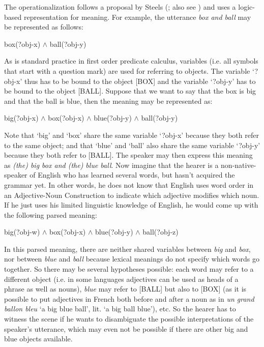 The operationalization follows a proposal by Steels (\citeyear{steels05what}; also see \cite{debeule07compositionality, steels05linking, steels06how-grammar}) and uses a logic-based representation for meaning. For example, the utterance {\em box and ball} may be represented as follows:

\ea
box(?obj-x) $\wedge$ ball(?obj-y)
\z

As is standard practice in first order predicate calculus, variables (i.e. all symbols that start with a question mark) are used for referring to objects. The variable `?obj-x' thus has to be bound to the object [BOX] and the variable `?obj-y' has to be bound to the object [BALL]. Suppose that we want to say that the box is big and that the ball is blue, then the meaning may be represented as:

\ea
\label{m:expressed}
big(?obj-x) $\wedge$ box(?obj-x) $\wedge$ blue(?obj-y) $\wedge$ ball(?obj-y)
\z

Note that `big' and `box' share the same variable `?obj-x' because they both refer to the same object; and that `blue' and `ball' also share the same variable `?obj-y' because they both refer to [BALL]. The speaker may then express this meaning as {\em (the) big box and (the) blue ball}. Now imagine that the hearer is a non-native-speaker of English who has learned several words, but hasn't acquired the grammar yet. In other words, he does not know that English uses word order in an Adjective-Noun Construction to indicate which adjective modifies which noun. If he just uses his limited linguistic knowledge of English, he would come up with the following parsed meaning:

\ea
\label{m:unexpressed}
big(?obj-w) $\wedge$ box(?obj-x) $\wedge$ blue(?obj-y) $\wedge$ ball(?obj-z)
\z

In this parsed meaning, there are neither shared variables between {\em big} and {\em box}, nor between {\em blue} and {\em ball} because lexical meanings do not specify which words go together. So there may be several hypotheses possible: each word may refer to a different object (i.e. in some languages adjectives can be used as heads of a phrase as well as nouns), {\em blue} may refer to [BALL] but also to [BOX] (as it is possible to put adjectives in French both before and after a noun as in {\em un grand ballon bleu} `a big blue ball', lit. `a big ball blue'), etc. So the hearer has to witness the scene if he wants to disambiguate the possible interpretations of the speaker's utterance, which may even not be possible if there are other big and blue objects available.

